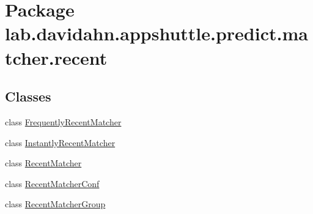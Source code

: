 \hypertarget{namespacelab_1_1davidahn_1_1appshuttle_1_1predict_1_1matcher_1_1recent}{\section{\-Package lab.\-davidahn.\-appshuttle.\-predict.\-matcher.\-recent}
\label{namespacelab_1_1davidahn_1_1appshuttle_1_1predict_1_1matcher_1_1recent}
}
\subsection*{\-Classes}
\begin{DoxyCompactItemize}
\item 
class \hyperlink{classlab_1_1davidahn_1_1appshuttle_1_1predict_1_1matcher_1_1recent_1_1_frequently_recent_matcher}{\-Frequently\-Recent\-Matcher}
\item 
class \hyperlink{classlab_1_1davidahn_1_1appshuttle_1_1predict_1_1matcher_1_1recent_1_1_instantly_recent_matcher}{\-Instantly\-Recent\-Matcher}
\item 
class \hyperlink{classlab_1_1davidahn_1_1appshuttle_1_1predict_1_1matcher_1_1recent_1_1_recent_matcher}{\-Recent\-Matcher}
\item 
class \hyperlink{classlab_1_1davidahn_1_1appshuttle_1_1predict_1_1matcher_1_1recent_1_1_recent_matcher_conf}{\-Recent\-Matcher\-Conf}
\item 
class \hyperlink{classlab_1_1davidahn_1_1appshuttle_1_1predict_1_1matcher_1_1recent_1_1_recent_matcher_group}{\-Recent\-Matcher\-Group}
\end{DoxyCompactItemize}
